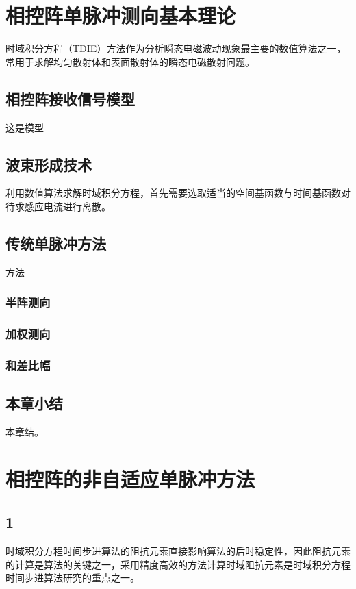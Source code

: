 \documentclass[master]{thesis-uestc}
\begin{document}
\chapter{相控阵单脉冲测向基本理论}
时域积分方程（TDIE）方法作为分析瞬态电磁波动现象最主要的数值算法之一，常用于求解均匀散射体和表面散射体的瞬态电磁散射问题。

\section{相控阵接收信号模型}
这是模型

\section{波束形成技术}
利用数值算法求解时域积分方程，首先需要选取适当的空间基函数与时间基函数对待求感应电流进行离散。

\section{传统单脉冲方法}
方法
\subsection{半阵测向}

\subsection{加权测向}

\subsection{和差比幅}

\section{本章小结}
本章结。

\chapter{相控阵的非自适应单脉冲方法}

\section{1}
时域积分方程时间步进算法的阻抗元素直接影响算法的后时稳定性，因此阻抗元素的计算是算法的关键之一，采用精度高效的方法计算时域阻抗元素是时域积分方程时间步进算法研究的重点之一。
\end{document}
